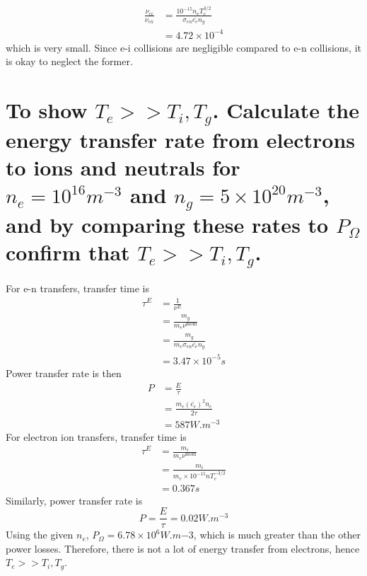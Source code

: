 \documentclass[answers]{exam}
\begin{document}
\begin{questions}
\begin{parts}
\begin{solution}
\begin{align*}
        \frac{\nu_{ei}}{\nu_{en}} &= \frac{10^{-15}n_eT_e^{3/2}}{\sigma_{en}\overline{c_e}n_g} \\
                                  &= 4.72 \times 10^{-4}
    \end{align*}
    which is very small. Since e-i collisions are negligible compared to e-n collisions, it is okay to neglect the former.
\end{solution}

\part{To show $T_e >> T_i, T_g$. Calculate the energy transfer rate from electrons to ions and neutrals for $n_e = 10^{16} \unit{m^{-3}}$ and $n_g = 5 \times 10^{20} \unit{m^{-3}}$, and by comparing these rates to $P_\Omega$ confirm that $T_e >> T_i, T_g$.}

\begin{solution}
    For e-n transfers, transfer time is
    \begin{align*}
        \tau^E &= \frac{1}{\nu^E} \\
             &= \frac{m_g}{m_e\nu^{\text{mom}}} \\
             &= \frac{m_g}{m_e\sigma_{en}\overline{c_e}n_g} \\
             &= 3.47 \times 10^{-5} \unit{s}
    \end{align*}
    Power transfer rate is then
    \begin{align*}
        P &= \frac{E}{\tau} \\
          &= \frac{m_e\left(\overline{c_e}\right)^2n_e}{2\tau} \\
          &= 587 \unit{W.m^{-3}}
    \end{align*}
    For electron ion transfers, transfer time is
    \begin{align*}
        \tau^E &= \frac{m_i}{m_e\nu^{\text{mom}}} \\
               &= \frac{m_i}{m_e\times10^{-15}nT_e^{-3/2}} \\
               &= 0.367 \unit{s}
    \end{align*}
    Similarly, power transfer rate is
    $$P = \frac{E}{\tau} = 0.02 \unit{W.m^{-3}}$$
    Using the given $n_e$, $P_\Omega = 6.78 \times 10^6 \unit{W.m{-3}}$, which is much greater than the other power losses. Therefore, there is not a lot of energy transfer from electrons, hence $T_e >> T_i,T_g$.
\end{solution}


\end{parts}
\end{questions}
\end{document}
